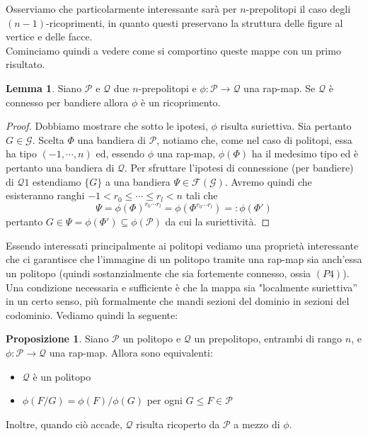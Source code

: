 \documentclass[a4paper,12pt]{report}
\newcommand{\p}{\mathcal{P}}
\theoremstyle{plain}
\theoremstyle{definition}
\newtheorem{lem}[teo]{Lemma}
\newtheorem{prop}[teo]{Proposizione}
\newcommand\flag[1]{\mathcal{F}(#1)}
\begin{document}
Osserviamo che particolarmente interessante sar\`a per $n$-prepolitopi il caso degli $(n-1)$-ricoprimenti, in quanto questi
preservano la struttura delle figure al vertice e delle facce.\\
Cominciamo quindi a vedere come si comportino queste mappe con un primo risultato.
\begin{lem}
\label{lem:Connectness-Covering}
Siano $\p$ e $\mathcal{Q}$ due $n$-prepolitopi e $\phi:\p\longrightarrow\mathcal{Q}$ una rap-map. Se $\mathcal{Q}$ \`e connesso per bandiere allora
$\phi$ \`e un ricoprimento.
\end{lem}
\begin{proof}
Dobbiamo mostrare che sotto le ipotesi, $\phi$ risulta suriettiva. Sia pertanto $G\in\mathcal{G}$. Scelta $\Phi$ una bandiera di $\p$, notiamo che,
come nel caso di politopi, essa ha tipo $(-1,\cdots,n)$ ed, essendo $\phi$ una rap-map, $\phi(\Phi)$ ha il medesimo tipo ed \`e pertanto una bandiera
di $\mathcal{Q}$. Per sfruttare l'ipotesi di connessione (per bandiere) di $\mathcal{Q}1$ estendiamo $\{G\}$ a una bandiera
$\Psi\in\flag{\mathcal{G}}$. Avremo quindi che esisteranno ranghi $-1<r_0\leq\cdots\leq r_l<n$ tali che
\begin{equation*}
\Psi=\phi(\Phi)^{r_0\cdots r_l}=\phi(\Phi^{r_0\cdots r_l})=:\phi(\Phi')
\end{equation*}
pertanto $G\in\Psi=\phi(\Phi')\subseteq\phi(\p)$ da cui la suriettivit\`a.
\end{proof}
Essendo interessati principalmente ai politopi vediamo una propriet\`a interessante che ci garantisce che l'immagine di un politopo tramite
una rap-map sia anch'essa un politopo (quindi sostanzialmente che sia fortemente connesso, ossia $(P4)$).\\
Una condizione necessaria e sufficiente \`e che la mappa sia "localmente suriettiva'' in un certo senso, pi\`u formalmente che mandi sezioni
del dominio in sezioni del codominio. Vediamo quindi la seguente:
\begin{prop}
\label{prop:PrepolytopeCovering}
Siano $\p$ un politopo e $\mathcal{Q}$ un prepolitopo, entrambi di rango $n$, e $\phi:\p\longrightarrow\mathcal{Q}$ una rap-map. Allora sono equivalenti:
\begin{itemize}
\item$\mathcal{Q}$ \`e un politopo
\item$\phi(F/G)=\phi(F)/\phi(G)$ per ogni $G\leq F\in\p$
\end{itemize}
Inoltre, quando ci\`o accade, $\mathcal{Q}$ risulta ricoperto da $\p$ a mezzo di $\phi$.
\end{prop}
\end{document}
